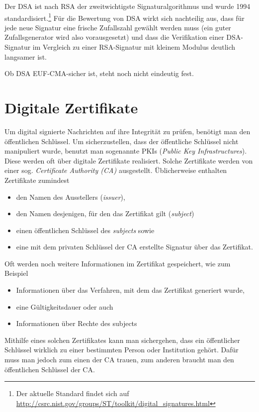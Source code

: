 Der DSA ist nach RSA der zweitwichtigste Signaturalgorithmus und wurde
1994 standardisiert.\footnote{Der aktuelle Standard findet sich auf
  \url{http://csrc.nist.gov/groups/ST/toolkit/digital_signatures.html}}
Für die Bewertung von DSA wirkt sich nachteilig aus, dass für jede neue
Signatur eine frische Zufallszahl gewählt werden muss (ein guter
Zufallsgenerator wird also vorausgesetzt) und dass die Verifikation
einer DSA-Signatur im Vergleich zu einer RSA-Signatur mit kleinem
Modulus deutlich langsamer ist.

Ob DSA EUF-CMA-sicher ist, steht noch nicht eindeutig fest.

\section{Digitale Zertifikate}
\indexDigitalCert Um digital signierte Nachrichten auf ihre Integrität
zu prüfen, benötigt man den öffentlichen Schlüssel. Um sicherzustellen,
dass der öffentliche Schlüssel nicht manipuliert wurde, benutzt man
sogenannte PKIs (\emph{Public Key Infrastructures}). Diese werden oft
über digitale Zertifikate realisiert. Solche Zertifikate werden von
einer sog. \emph{Certificate Authority (CA)}\indexCertAuthority
ausgestellt. Üblicherweise enthalten Zertifikate zumindest
\begin{itemize}
\item den Namen des Ausstellers (\emph{issuer}),
\item den Namen desjenigen, für den das Zertifikat gilt (\emph{subject})
\item einen öffentlichen Schlüssel des \emph{subjects} sowie
\item eine mit dem privaten Schlüssel der CA erstellte Signatur über
  das Zertifikat.
\end{itemize} Oft werden noch weitere Informationen im Zertifikat
gespeichert, wie zum Beispiel
\begin{itemize}
\item Informationen über das Verfahren, mit dem das Zertifikat generiert
  wurde,
\item eine Gültigkeitsdauer oder auch
\item Informationen über Rechte des subjects
\end{itemize}

Mithilfe eines solchen Zertifikates kann man sichergehen, dass ein
öffentlicher Schlüssel wirklich zu einer bestimmten Person oder
Institution gehört. Dafür muss man jedoch zum einen der CA
\indexCertAuthority trauen, zum anderen braucht man den öffentlichen
Schlüssel der CA.

